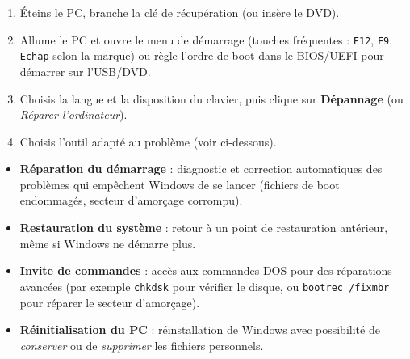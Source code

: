 \documentclass[11pt]{article}
\begin{document}
\begin{methode}
\begin{enumerate}
\item Éteins le PC, branche la clé de récupération (ou insère le DVD).
\item Allume le PC et ouvre le menu de démarrage (touches fréquentes : \texttt{F12}, \texttt{F9}, \texttt{Echap} selon la marque) ou règle l'ordre de boot dans le BIOS/UEFI pour démarrer sur l'USB/DVD.
\item Choisis la langue et la disposition du clavier, puis clique sur \textbf{Dépannage} (ou \emph{Réparer l'ordinateur}).
\item Choisis l'outil adapté au problème (voir ci-dessous).
\end{enumerate}
\end{methode}

\begin{propriete}
\begin{itemize}
\item \textbf{Réparation du démarrage} : diagnostic et correction automatiques des problèmes qui empêchent Windows de se lancer (fichiers de boot endommagés, secteur d'amorçage corrompu).
\item \textbf{Restauration du système} : retour à un point de restauration antérieur, même si Windows ne démarre plus.
\item \textbf{Invite de commandes} : accès aux commandes DOS pour des réparations avancées (par exemple \texttt{chkdsk} pour vérifier le disque, ou \texttt{bootrec /fixmbr} pour réparer le secteur d'amorçage).
\item \textbf{Réinitialisation du PC} : réinstallation de Windows avec possibilité de \emph{conserver} ou de \emph{supprimer} les fichiers personnels.
\end{itemize}
\end{propriete}
\end{document}
